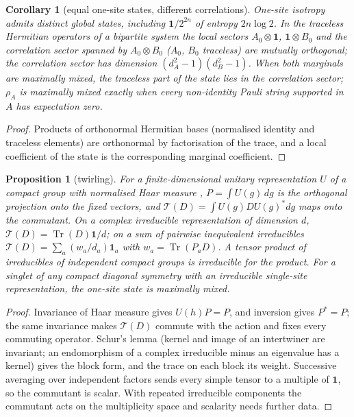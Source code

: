 \documentclass[aps,pra,onecolumn,superscriptaddress,nofootinbib,10pt]{revtex4-2}
\newtheorem{proposition}[theorem]{Proposition}
\newtheorem{corollary}[theorem]{Corollary}
\theoremstyle{definition}
\theoremstyle{remark}
\newcommand{\tr}{\operatorname{Tr}}
\begin{document}
\begin{corollary}[equal one-site states, different correlations]\label{cor:cucorr}
One-site isotropy admits distinct global states, including $\mathbf1/2^{2n}$ of entropy $2n\log2$.  In the traceless
Hermitian operators of a bipartite system the local sectors $A_0\otimes\mathbf1$, $\mathbf1\otimes B_0$ and the correlation sector
spanned by $A_0\otimes B_0$ ($A_0$, $B_0$ traceless) are mutually orthogonal; the correlation sector has dimension
$(d_A^2-1)(d_B^2-1)$.  When both marginals are maximally mixed, the traceless part of the state lies in the
correlation sector; $\rho_A$ is maximally mixed exactly when every non-identity Pauli string supported in $A$ has
expectation zero.
\end{corollary}
\begin{proof}
Products of orthonormal Hermitian bases (normalised identity and traceless elements) are orthonormal by
factorisation of the trace, and a local coefficient of the state is the corresponding marginal
coefficient.
\end{proof}

\begin{proposition}[twirling]\label{prop:cutwirl}
For a finite-dimensional unitary representation $U$ of a compact group with normalised Haar measure
\cite{n1-haar}, $P=\int U(g)\,dg$ is the orthogonal projection onto the fixed vectors, and $\mathcal T(D)=\int U(g)DU(g)^*dg$
maps onto the commutant.  On a complex irreducible representation of dimension $d$, $\mathcal T(D)=\tr(D)\mathbf1/d$; on a
sum of pairwise inequivalent irreducibles $\mathcal T(D)=\sum_a(w_a/d_a)\mathbf1_a$ with $w_a=\tr(P_aD)$.  A tensor product of
irreducibles of independent compact groups is irreducible for the product.  For a singlet of any compact
diagonal symmetry with an irreducible single-site representation, the one-site state is maximally mixed.
\end{proposition}
\begin{proof}
Invariance of Haar measure gives $U(h)P=P$, and inversion gives $P^*=P$; the same invariance makes $\mathcal T(D)$
commute with the action and fixes every commuting operator.  Schur's lemma (kernel and image of an
intertwiner are invariant; an endomorphism of a complex irreducible minus an eigenvalue has a kernel)
gives the block form, and the trace on each block its weight.  Successive averaging over independent
factors sends every simple tensor to a multiple of $\mathbf1$, so the commutant is scalar.  With repeated
irreducible components the commutant acts on the multiplicity space and scalarity needs further data.
\end{proof}
\end{document}
